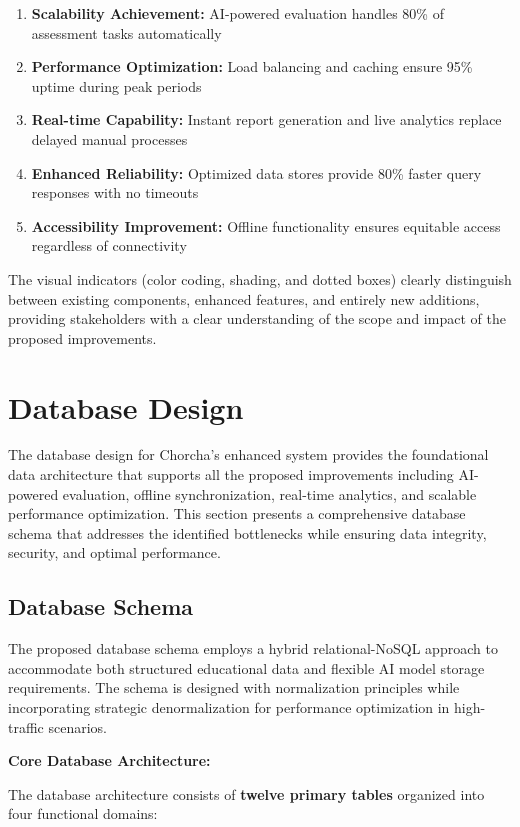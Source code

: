 \documentclass[12pt,a4paper,oneside]{book}
\begin{document}
\begin{enumerate}
    \item \textbf{Scalability Achievement:} AI-powered evaluation handles 80\% of assessment tasks automatically
    \item \textbf{Performance Optimization:} Load balancing and caching ensure 95\% uptime during peak periods
    \item \textbf{Real-time Capability:} Instant report generation and live analytics replace delayed manual processes
    \item \textbf{Enhanced Reliability:} Optimized data stores provide 80\% faster query responses with no timeouts
    \item \textbf{Accessibility Improvement:} Offline functionality ensures equitable access regardless of connectivity
\end{enumerate}

The visual indicators (color coding, shading, and dotted boxes) clearly distinguish between existing components, enhanced features, and entirely new additions, providing stakeholders with a clear understanding of the scope and impact of the proposed improvements.

\section{Database Design}

The database design for Chorcha's enhanced system provides the foundational data architecture that supports all the proposed improvements including AI-powered evaluation, offline synchronization, real-time analytics, and scalable performance optimization. This section presents a comprehensive database schema that addresses the identified bottlenecks while ensuring data integrity, security, and optimal performance.

\subsection{Database Schema}

The proposed database schema employs a hybrid relational-NoSQL approach to accommodate both structured educational data and flexible AI model storage requirements. The schema is designed with normalization principles while incorporating strategic denormalization for performance optimization in high-traffic scenarios.

\textbf{Core Database Architecture:}

The database architecture consists of \textbf{twelve primary tables} organized into four functional domains:
\end{document}
